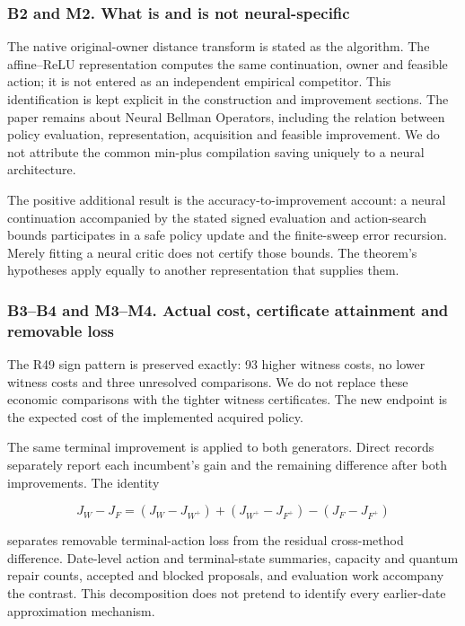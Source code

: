 \hypertarget{b2-and-m2.-what-is-and-is-not-neural-specific}{%
\subsubsection{B2 and M2. What is and is not
neural-specific}\label{b2-and-m2.-what-is-and-is-not-neural-specific}}

The native original-owner distance transform is stated as the algorithm.
The affine--ReLU representation computes the same continuation, owner
and feasible action; it is not entered as an independent empirical
competitor. This identification is kept explicit in the construction and
improvement sections. The paper remains about Neural Bellman Operators,
including the relation between policy evaluation, representation,
acquisition and feasible improvement. We do not attribute the common
min-plus compilation saving uniquely to a neural architecture.

The positive additional result is the accuracy-to-improvement account: a
neural continuation accompanied by the stated signed evaluation and
action-search bounds participates in a safe policy update and the
finite-sweep error recursion. Merely fitting a neural critic does not
certify those bounds. The theorem's hypotheses apply equally to another
representation that supplies them.

\hypertarget{b3b4-and-m3m4.-actual-cost-certificate-attainment-and-removable-loss}{%
\subsubsection{B3--B4 and M3--M4. Actual cost, certificate attainment
and removable
loss}\label{b3b4-and-m3m4.-actual-cost-certificate-attainment-and-removable-loss}}

The R49 sign pattern is preserved exactly: 93 higher witness costs, no
lower witness costs and three unresolved comparisons. We do not replace
these economic comparisons with the tighter witness certificates. The
new endpoint is the expected cost of the implemented acquired policy.

The same terminal improvement is applied to both generators. Direct
records separately report each incumbent's gain and the remaining
difference after both improvements. The identity

\[
 J_W-J_F=(J_W-J_{W^+})+(J_{W^+}-J_{F^+})-(J_F-J_{F^+})
\]

separates removable terminal-action loss from the residual cross-method
difference. Date-level action and terminal-state summaries, capacity and
quantum repair counts, accepted and blocked proposals, and evaluation
work accompany the contrast. This decomposition does not pretend to
identify every earlier-date approximation mechanism.

